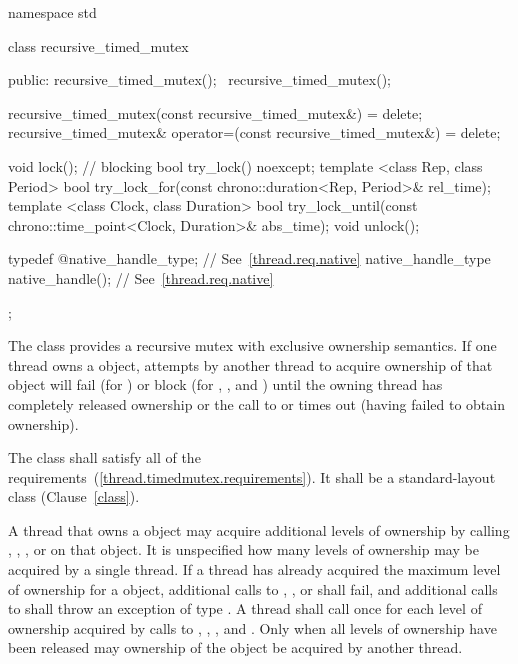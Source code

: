 \begin{codeblock}
namespace std {
  class recursive_timed_mutex {
  public:
    recursive_timed_mutex();
    ~recursive_timed_mutex();

    recursive_timed_mutex(const recursive_timed_mutex&) = delete;
    recursive_timed_mutex& operator=(const recursive_timed_mutex&) = delete;

    void lock();  // blocking
    bool try_lock() noexcept;
    template <class Rep, class Period>
      bool try_lock_for(const chrono::duration<Rep, Period>& rel_time);
    template <class Clock, class Duration>
      bool try_lock_until(const chrono::time_point<Clock, Duration>& abs_time);
    void unlock();

    typedef @\impdef@ native_handle_type; // See~\ref{thread.req.native}
    native_handle_type native_handle();                // See~\ref{thread.req.native}
  };
}
\end{codeblock}

\pnum
The class  provides a recursive mutex with exclusive
ownership semantics. If one thread owns a  object,
attempts by another thread to acquire ownership of that object will fail (for
) or block (for , , and
) until the owning thread has completely released
ownership or the call to  or 
times out (having failed to obtain ownership).

\pnum
The class  shall satisfy all of the 
requirements~(\ref{thread.timedmutex.requirements}). It shall be a standard-layout
class (Clause~\ref{class}).

\pnum
A thread that owns a  object may acquire additional
levels of ownership by calling , ,
, or  on that object. It is
unspecified how many levels of ownership may be acquired by a single thread. If
a thread has already acquired the maximum level of ownership for a
 object, additional calls to ,
, or  shall fail, and additional
calls to  shall throw an exception of type . A
thread shall call  once for each level of ownership acquired by
calls to , , , and
. Only when all levels of ownership have been released
may ownership of the object be acquired by another thread.

